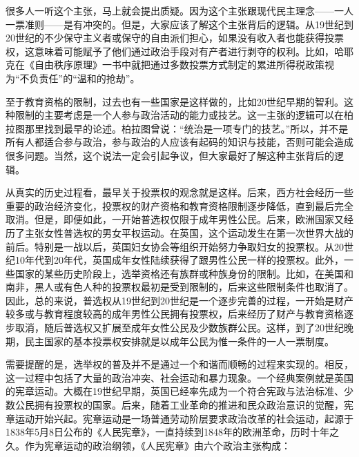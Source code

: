 {很多人一听这个主张，马上就会提出质疑。因为这个主张跟现代民主理念——一人一票准则——是有冲突的。但是，大家应该了解这个主张背后的逻辑。从19世纪到20世纪的不少保守主义者或保守的自由派们担心，如果没有收入者也能获得投票权，这意味着可能赋予了他们通过政治手段对有产者进行剥夺的权利。比如，哈耶克在《自由秩序原理》一书中就把通过多数投票方式制定的累进所得税政策视为“不负责任”的“温和的抢劫”。

至于教育资格的限制，过去也有一些国家是这样做的，比如20世纪早期的智利。这种限制的主要考虑是一个人参与政治活动的能力或技艺。这一主张的逻辑可以在柏拉图那里找到最早的论述。柏拉图曾说：“统治是一项专门的技艺。”所以，并不是所有人都适合参与政治，参与政治的人应该有起码的知识与技能，否则可能会造成很多问题。当然，这个说法一定会引起争议，但大家最好了解这种主张背后的逻辑。

从真实的历史过程看，最早关于投票权的观念就是这样。后来，西方社会经历一些重要的政治经济变化，投票权的财产资格和教育资格限制逐步降低，直到最后完全取消。但是，即便如此，一开始普选权仅限于成年男性公民。后来，欧洲国家又经历了主张女性普选权的男女平权运动。在英国，这个运动发生在第一次世界大战的前后。特别是一战以后，英国妇女协会等组织开始努力争取妇女的投票权。从20世纪10年代到20年代，英国成年女性陆续获得了跟男性公民一样的投票权。此外，一些国家的某些历史阶段上，选举资格还有族群或种族身份的限制。比如，在美国和南非，黑人或有色人种的投票权最初是受到限制的，后来这些限制条件也取消了。因此，总的来说，普选权从19世纪到20世纪是一个逐步完善的过程，一开始是财产较多或与教育程度较高的成年男性公民拥有投票权，后来经历了财产与教育资格逐步取消，随后普选权又扩展至成年女性公民及少数族群公民。这样，到了20世纪晚期，民主国家的基本投票权安排就是以成年公民为惟一条件的一人一票制度。

需要提醒的是，选举权的普及并不是通过一个和谐而顺畅的过程来实现的。相反，这一过程中包括了大量的政治冲突、社会运动和暴力现象。一个经典案例就是英国的宪章运动。大概在19世纪早期，英国已经率先成为一个符合宪政与法治标准、少数公民拥有投票权的国家。后来，随着工业革命的推进和民众政治意识的觉醒，宪章运动开始兴起。宪章运动是一场普通劳动阶层要求政治改革的社会运动，起源于1838年5月8日公布的《人民宪章》，一直持续到1848年的欧洲革命，历时十年之久。作为宪章运动的政治纲领，《人民宪章》由六个政治主张构成：

}
